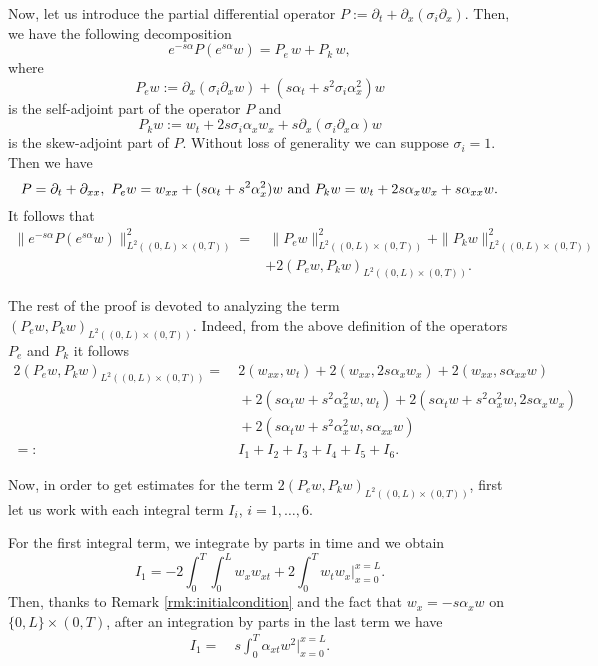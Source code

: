 \documentclass[10pt]{article}
\def\\Phivec{\mathbf{\Phi}}
\newcommand{\ii}{\iiTL }
\newcommand{\iiTL}{\int_0^T\!\!\!\!\int_0^L }
\begin{document}
\begin{appendix}
	Now, let us introduce the partial differential operator
	$P:=\partial_t+\partial_{x}(\sigma_i\partial_x)$. Then, we have the following decomposition
\[
	e^{-s\alpha} P(e^{s\alpha} w ) = P_e\, w + P_k\,w,
\]
	where
\[
	P_{e} w:=\partial_{x}(\sigma_i\partial_xw)+(s\alpha_t+s^2\sigma_i\alpha_x^2)w
\]
	is the self-adjoint part of the operator $P$ and
\[
	P_{k}w:=w_t+2s\sigma_i\alpha_xw_x+s\partial_{x}(\sigma_i\partial_x\alpha) w
\]
	is the skew-adjoint part of $P$. Without loss of generality we can suppose $\sigma_i=1$. Then we have
$$
	P=\partial_t+\partial_{xx},~
	P_{e} w=w_{xx}+(s\alpha_t+s^2\alpha_x^2)w~
	\hbox{and}~
	P_{k}w=w_t+2s\alpha_xw_x+s\alpha_{xx} w.
$$
It follows that
\begin{equation}\label{eq:L2norm}
\begin{alignedat}{2}
	\|e^{-s\alpha} P(e^{s\alpha} w )\|^2_{L^2((0,L)\times(0,T))}=&~\|P_e w\|^2_{L^2((0,L)\times(0,T))}+\|P_k w\|^2_{L^2((0,L)\times(0,T))}\\
										&+2(P_e w,P_k w)_{L^2((0,L)\times(0,T))}.
\end{alignedat}
\end{equation}

	The rest of the proof is devoted to analyzing the term $(P_e w,P_k w)_{L^2((0,L)\times(0,T))}$. Indeed, from the above definition
	of the operators $P_e$ and $P_k$ it follows
\begin{equation}\label{eq:pepk}
\begin{alignedat}{2}
	2(P_e w, P_k w)_{L^2((0,L)\times(0,T))} =	&~2\left(w_{xx}, w_t\right)+2\left(w_{xx},2s\alpha_x w_x\right)
						+2\left(w_{xx},s\alpha_{xx} w\right)\\
						&~+2\left(s\alpha_tw+s^2\alpha_x ^2w,w_t\right)
						+2\left(s\alpha_tw+s^2 \alpha _x^2w,2s\alpha_x w_x\right)\\
						&~+2\left(s\alpha_tw+s^2\alpha_x^2w,s\alpha_{xx} w\right)   \\
	=:&~I_1 + I_2 + I_3 + I_4+I_5+I_6.
\end{alignedat}
\end{equation}

	Now, in order to get estimates for the term $2(P_e w, P_k w)_{L^2((0,L)\times(0,T))}$,
	first let us work with each integral term $I_i$, $i=1,\ldots,6$.
	
	For the first integral term, we integrate by parts in time and we obtain
\[
	I_1=- 2\ii w_{x}w_{xt}+2\int_0^T
	      w_t  w_x\bigg|_{x=0}^{x=L}.
\]
	Then, thanks to Remark \ref{rmk:initialcondition} and the fact that $w_x=-s \alpha_x w $ on $\{0,L\}\times(0,T)$,
	after an integration by parts in the last term we have
\begin{equation}\label{eq:I_1}
\begin{alignedat}{2}
	I_1=&~s\int_0^T \alpha_{xt}w^2\bigg|_{x=0}^{x=L}.
\end{alignedat}
\end{equation}


\end{appendix}
\end{document}
